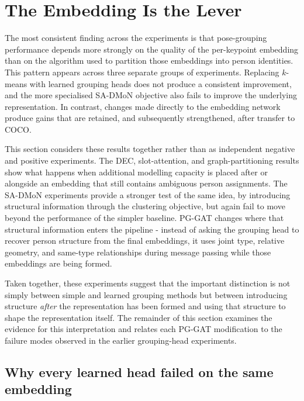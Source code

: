 \section{The Embedding Is the Lever}
\label{sec_disc_embedding}

The most consistent finding across the experiments is that pose-grouping
performance depends more strongly on the quality of the per-keypoint
embedding than on the algorithm used to partition those embeddings into
person identities.
This pattern appears across three separate groups of experiments.
Replacing $k$-means with learned grouping heads does not produce
a consistent improvement,
and the more specialised SA-DMoN objective also fails to improve
the underlying representation.
In contrast, changes made directly to the embedding network produce
gains that are retained, and subsequently strengthened, after transfer
to COCO.

This section considers these results together
rather than as independent negative and positive experiments.
The DEC, slot-attention, and graph-partitioning results show what
happens when additional modelling capacity is placed after or alongside
an embedding that still contains ambiguous person assignments.
The SA-DMoN experiments provide a stronger test of the same idea,
by introducing structural information through the clustering objective,
but again fail to move beyond the performance of the simpler baseline.
PG-GAT changes where that structural information enters the pipeline -
instead of asking the grouping head to recover person structure
from the final embeddings,
it uses joint type,
relative geometry,
and same-type relationships during message passing while those
embeddings are being formed.

Taken together, these experiments suggest that the important
distinction is not simply between simple and learned grouping methods
but between introducing structure \emph{after} the representation has
been formed and using that structure to shape the representation itself.
The remainder of this section examines the evidence for this
interpretation
and relates each PG-GAT modification to the failure modes observed
in the earlier grouping-head experiments.

\subsection{Why every learned head failed on the same embedding}
\label{sec_disc_embedding_heads}

